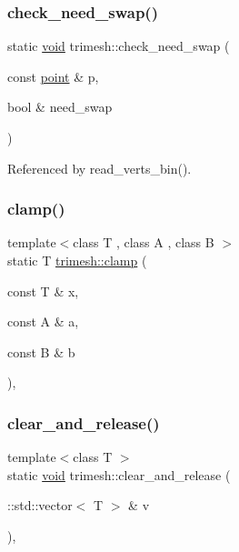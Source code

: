 \subsubsection{\texorpdfstring{check\+\_\+need\+\_\+swap()}{check\_need\_swap()}}
{\footnotesize\ttfamily static \hyperlink{namespacetrimesh_a784ddfd979e1c579bda795a8edfc3f43}{void} trimesh\+::check\+\_\+need\+\_\+swap (\begin{DoxyParamCaption}\item[{const \hyperlink{namespacetrimesh_a325b99fd6454b22fa4c4bc3223271b2c}{point} \&}]{p,  }\item[{bool \&}]{need\+\_\+swap }\end{DoxyParamCaption})\hspace{0.3cm}{\ttfamily [static]}}



Referenced by read\+\_\+verts\+\_\+bin().

\mbox{\label{namespacetrimesh_ae913dc8d8f6d1d2161705a6bdd9b4a8f}} 
\subsubsection{\texorpdfstring{clamp()}{clamp()}}
{\footnotesize\ttfamily template$<$class T , class A , class B $>$ \\
static T \hyperlink{namespacetrimesh_add94ef6721eddee12fecac8a43c8a912}{trimesh\+::clamp} (\begin{DoxyParamCaption}\item[{const T \&}]{x,  }\item[{const A \&}]{a,  }\item[{const B \&}]{b }\end{DoxyParamCaption})\hspace{0.3cm}{\ttfamily [inline]}, {\ttfamily [static]}}

\mbox{\label{namespacetrimesh_a795d71444546c11c5cf031befe1c5b5f}} 
\subsubsection{\texorpdfstring{clear\+\_\+and\+\_\+release()}{clear\_and\_release()}}
{\footnotesize\ttfamily template$<$class T $>$ \\
static \hyperlink{namespacetrimesh_a784ddfd979e1c579bda795a8edfc3f43}{void} trimesh\+::clear\+\_\+and\+\_\+release (\begin{DoxyParamCaption}\item[{\+::std\+::vector$<$ T $>$ \&}]{v }\end{DoxyParamCaption})\hspace{0.3cm}{\ttfamily [inline]}, {\ttfamily [static]}}



